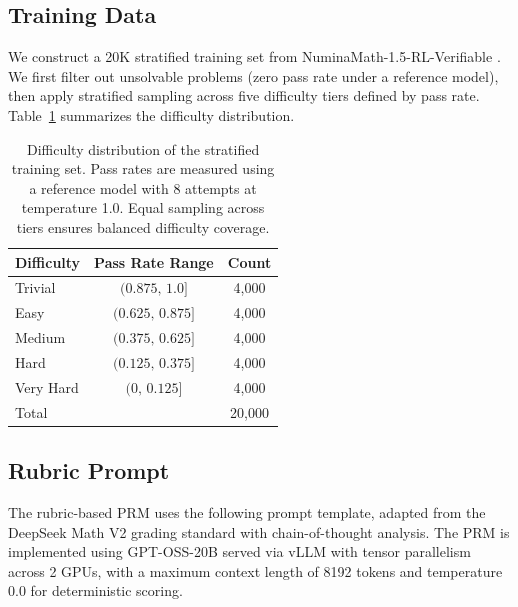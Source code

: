 \subsection{Training Data}
\label{sec:training-data}

We construct a 20K stratified training set from NuminaMath-1.5-RL-Verifiable \citep{numina_math_datasets,nlile2025numinamath15rlverifiable}. We first filter out unsolvable problems (zero pass rate under a reference model), then apply stratified sampling across five difficulty tiers defined by pass rate. Table~\ref{tab:difficulty} summarizes the difficulty distribution.

\begin{table}[h]
\centering
\small
\begin{tabular}{lcc}
\toprule
\textbf{Difficulty} & \textbf{Pass Rate Range} & \textbf{Count} \\
\midrule
Trivial & $(0.875,\, 1.0]$ & 4{,}000 \\
Easy & $(0.625,\, 0.875]$ & 4{,}000 \\
Medium & $(0.375,\, 0.625]$ & 4{,}000 \\
Hard & $(0.125,\, 0.375]$ & 4{,}000 \\
Very Hard & $(0,\, 0.125]$ & 4{,}000 \\
\midrule
Total & & 20{,}000 \\
\bottomrule
\end{tabular}
\caption{Difficulty distribution of the stratified training set. Pass rates are measured using a reference model with 8 attempts at temperature 1.0. Equal sampling across tiers ensures balanced difficulty coverage.}
\label{tab:difficulty}
\end{table}

\subsection{Rubric Prompt}
\label{sec:rubric-prompt}

The rubric-based PRM uses the following prompt template, adapted from the DeepSeek Math V2 grading standard with chain-of-thought analysis. The PRM is implemented using GPT-OSS-20B served via vLLM with tensor parallelism across 2 GPUs, with a maximum context length of 8192 tokens and temperature 0.0 for deterministic scoring.

